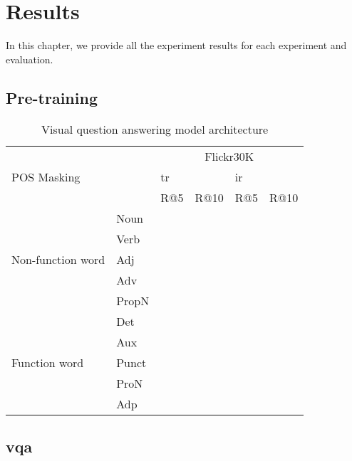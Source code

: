 \chapter{Results}
In this chapter, we provide all the experiment results for each experiment and evaluation.

\section{Pre-training}

\begin{table}[]
    \centering
    \label{tab:flickr30k}
    \caption{Visual question answering model architecture}
    \begin{tabular}{ll|llll}
        \multicolumn{2}{l|}{\multirow{3}{*}{POS Masking}} & \multicolumn{4}{c}{Flickr30K}                   \\
        \multicolumn{2}{l|}{}                             & \multicolumn{2}{l}{\acrshort{tr}} & \multicolumn{2}{l}{\acrshort{ir}} \\
        \multicolumn{2}{l|}{}                             & R@5       & R@10       & R@5       & R@10       \\
        \hline
        \multirow{5}{*}{Non-function word}    & Noun     &           &            &           &            \\
        & Verb     &           &            &           &            \\
        & Adj      &           &            &           &            \\
        & Adv      &           &            &           &            \\
        & PropN    &           &            &           &            \\
        \hline
        \multirow{5}{*}{Function word}        & Det      &           &            &           &            \\
        & Aux      &           &            &           &            \\
        & Punct    &           &            &           &            \\
        & ProN     &           &            &           &            \\
        & Adp      &           &            &           &           
    \end{tabular}
\end{table}

\section{\Acrlong{vqa}}